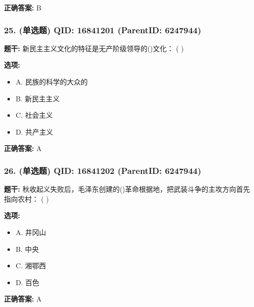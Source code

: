 \documentclass[12pt,UTF8]{ctexart}
\begin{document}
\textbf{正确答案:}
B

\vspace{0.3em}\hrulefill\vspace{0.7em}

\subsubsection*{25. (单选题) \small QID: 16841201 (ParentID: 6247944)}

\textbf{题干:}
新民主主义文化的特征是无产阶级领导的()文化： ( )



\textbf{选项:}
\begin{itemize}[leftmargin=*]

  \item A. 民族的科学的大众的

  \item B. 新民主主义

  \item C. 社会主义

  \item D. 共产主义

\end{itemize}

\textbf{正确答案:}
A

\vspace{0.3em}\hrulefill\vspace{0.7em}

\subsubsection*{26. (单选题) \small QID: 16841202 (ParentID: 6247944)}

\textbf{题干:}
秋收起义失败后，毛泽东创建的()革命根据地，把武装斗争的主攻方向首先指向农村： ( )



\textbf{选项:}
\begin{itemize}[leftmargin=*]

  \item A. 井冈山

  \item B. 中央

  \item C. 湘鄂西

  \item D. 百色

\end{itemize}

\textbf{正确答案:}
A
\end{document}
